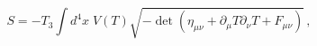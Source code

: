\begin{equation}\label{fa}
S= -T_3 \int d^4x\; V(T) \sqrt{-\det (\eta_{\mu\nu} +
\partial_\mu T\partial_\nu T + F_{\mu\nu})}\, ,
\end{equation}

